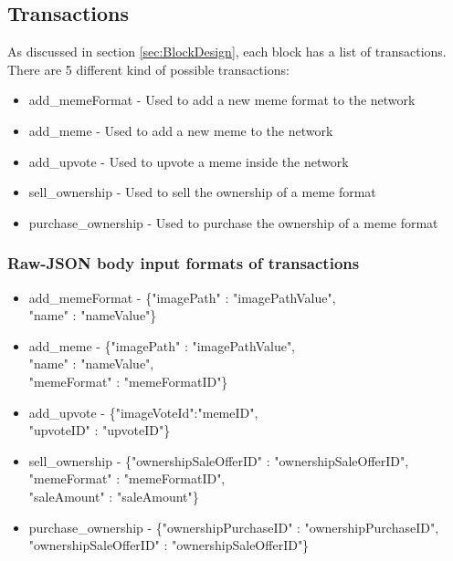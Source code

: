 \documentclass[12pt]{article}
\begin{document}
\subsection{Transactions} %

As discussed in section \ref{sec:BlockDesign}, each block has a list of transactions. There are 5 different kind of possible transactions:
\begin{itemize}
  \item add\_memeFormat - Used to add a new meme format to the network
  \item add\_meme - Used to add a new meme to the network
  \item add\_upvote - Used to upvote a meme inside the network
  \item sell\_ownership - Used to sell the ownership of a meme format
  \item purchase\_ownership - Used to purchase the ownership of a meme format
\end{itemize}

\subsubsection{Raw-JSON body input formats of transactions}

\begin{itemize}
\item add\_memeFormat - \{"imagePath" : "imagePathValue",\\ "name" : "nameValue"\}

\item add\_meme - \{"imagePath" : "imagePathValue",\\ "name" : "nameValue",\\ "memeFormat" : "memeFormatID"\}

\item add\_upvote - \{"imageVoteId":"memeID",\\ "upvoteID" : "upvoteID"\}

\item sell\_ownership - \{"ownershipSaleOfferID" : "ownershipSaleOfferID",\\ "memeFormat" : "memeFormatID",\\ "saleAmount" : "saleAmount"\}

\item purchase\_ownership - \{"ownershipPurchaseID" : "ownershipPurchaseID",\\ "ownershipSaleOfferID" : "ownershipSaleOfferID"\}
\end{itemize}
\end{document}
